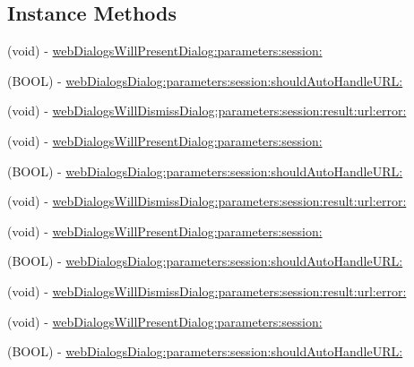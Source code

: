 \subsection*{Instance Methods}
\begin{DoxyCompactItemize}
\item 
(void) -\/ \hyperlink{protocolFBWebDialogsDelegate-p_ac6f3987eabbd6352322ada6819935e1e}{web\+Dialogs\+Will\+Present\+Dialog\+:parameters\+:session\+:}
\item 
(B\+O\+OL) -\/ \hyperlink{protocolFBWebDialogsDelegate-p_afcca4d563c9b0cc120336bdc5bd35218}{web\+Dialogs\+Dialog\+:parameters\+:session\+:should\+Auto\+Handle\+U\+R\+L\+:}
\item 
(void) -\/ \hyperlink{protocolFBWebDialogsDelegate-p_a548c82f8be08d662c976bbf87d05d34a}{web\+Dialogs\+Will\+Dismiss\+Dialog\+:parameters\+:session\+:result\+:url\+:error\+:}
\item 
(void) -\/ \hyperlink{protocolFBWebDialogsDelegate-p_ac6f3987eabbd6352322ada6819935e1e}{web\+Dialogs\+Will\+Present\+Dialog\+:parameters\+:session\+:}
\item 
(B\+O\+OL) -\/ \hyperlink{protocolFBWebDialogsDelegate-p_afcca4d563c9b0cc120336bdc5bd35218}{web\+Dialogs\+Dialog\+:parameters\+:session\+:should\+Auto\+Handle\+U\+R\+L\+:}
\item 
(void) -\/ \hyperlink{protocolFBWebDialogsDelegate-p_a548c82f8be08d662c976bbf87d05d34a}{web\+Dialogs\+Will\+Dismiss\+Dialog\+:parameters\+:session\+:result\+:url\+:error\+:}
\item 
(void) -\/ \hyperlink{protocolFBWebDialogsDelegate-p_ac6f3987eabbd6352322ada6819935e1e}{web\+Dialogs\+Will\+Present\+Dialog\+:parameters\+:session\+:}
\item 
(B\+O\+OL) -\/ \hyperlink{protocolFBWebDialogsDelegate-p_afcca4d563c9b0cc120336bdc5bd35218}{web\+Dialogs\+Dialog\+:parameters\+:session\+:should\+Auto\+Handle\+U\+R\+L\+:}
\item 
(void) -\/ \hyperlink{protocolFBWebDialogsDelegate-p_a548c82f8be08d662c976bbf87d05d34a}{web\+Dialogs\+Will\+Dismiss\+Dialog\+:parameters\+:session\+:result\+:url\+:error\+:}
\item 
(void) -\/ \hyperlink{protocolFBWebDialogsDelegate-p_ac6f3987eabbd6352322ada6819935e1e}{web\+Dialogs\+Will\+Present\+Dialog\+:parameters\+:session\+:}
\item 
(B\+O\+OL) -\/ \hyperlink{protocolFBWebDialogsDelegate-p_afcca4d563c9b0cc120336bdc5bd35218}{web\+Dialogs\+Dialog\+:parameters\+:session\+:should\+Auto\+Handle\+U\+R\+L\+:}
\item 

\end{DoxyCompactItemize}

